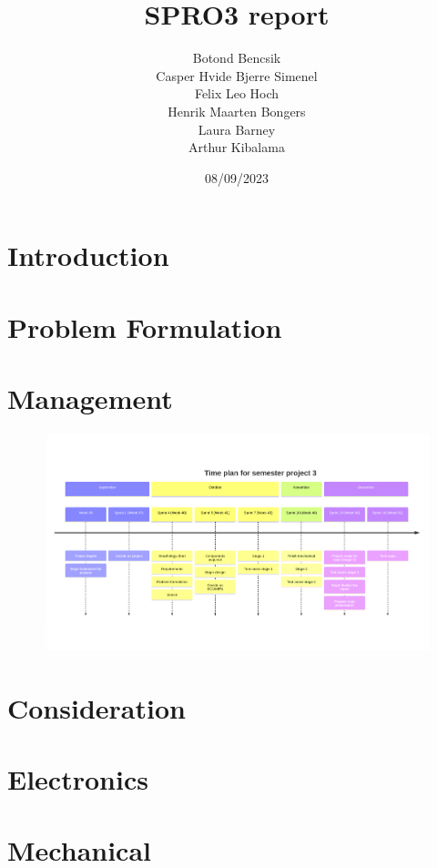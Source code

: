 \documentclass[11pt]{article}
\title{SPRO3 report}
\date{08/09/2023}
\author{Botond Bencsik\\Casper Hvide Bjerre Simenel\\Felix Leo Hoch\\Henrik Maarten Bongers\\Laura Barney\\Arthur Kibalama}
\begin{document}
\maketitle
 
\tableofcontents
\newpage
\section{Introduction}
         
\section{Problem Formulation}
    
\section{Management}
    
    \begin{figure}[H]
        \includegraphics[width=\textwidth]{Management/timeplan.png}
    \end{figure}
\section{Consideration}
    
\section{Electronics}
    
    
\section{Mechanical}
\end{document}
